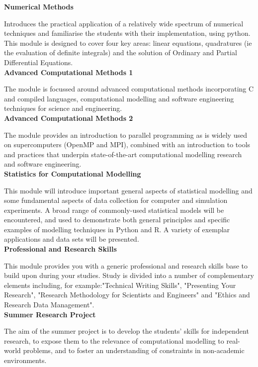 \documentclass[12pt]{article}
\begin{document}
\textbf{Numerical Methods}

Introduces the practical application of a relatively wide spectrum of numerical techniques and familiarise the students with their implementation, using  python.
This module is designed to cover four key areas: linear equations, quadratures (ie the evaluation of definite integrals) and the solution of Ordinary and Partial Differential Equations.
\\

\textbf{Advanced Computational Methods 1} 
 
The module is focussed around advanced computational methods incorporating C and compiled languages, computational modelling and software engineering techniques for science and engineering.
\\

\textbf{Advanced Computational Methods 2} 

The module provides an introduction to parallel programming as is widely used on supercomputers (OpenMP and MPI), combined with an introduction to tools and practices that underpin state-of-the-art computational modelling research and software engineering.
\\

\textbf{Statistics for Computational Modelling}

This module will introduce important general aspects of statistical modelling and some fundamental aspects of data collection for computer and simulation experiments. A broad range of commonly-used statistical models will be encountered, and used to demonstrate both general principles and specific examples of modelling techniques in Python and R. A variety of exemplar applications and data sets will be presented.
\\

\textbf{Professional and Research Skills}

This module provides you with a generic professional and research skills base to build upon during your studies. Study is divided into a number of complementary elements including, for example:"Technical Writing Skills", "Presenting Your Research", "Research Methodology for Scientists and Engineers" and "Ethics and Research Data Management". 
\\

\textbf{Summer Research Project}

The aim of the summer project is to develop the students' skills for independent research, to expose them to the relevance of computational modelling to real-world problems, and to foster an understanding of constraints in non-academic environments.
\\
\end{document}
